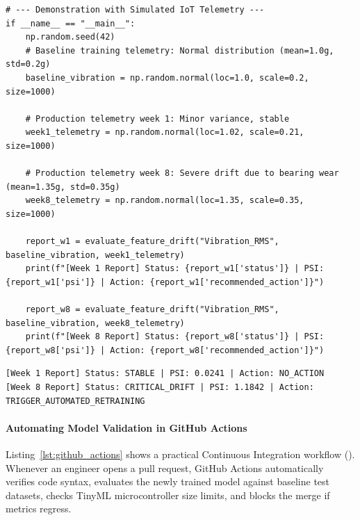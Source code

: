 \begin{lstlisting}[style=pythonstyle, caption={Production drift detection script with PSI and Kolmogorov-Smirnov test.}, label={lst:drift_detector}]
# --- Demonstration with Simulated IoT Telemetry ---
if __name__ == "__main__":
    np.random.seed(42)
    # Baseline training telemetry: Normal distribution (mean=1.0g, std=0.2g)
    baseline_vibration = np.random.normal(loc=1.0, scale=0.2, size=1000)

    # Production telemetry week 1: Minor variance, stable
    week1_telemetry = np.random.normal(loc=1.02, scale=0.21, size=1000)

    # Production telemetry week 8: Severe drift due to bearing wear (mean=1.35g, std=0.35g)
    week8_telemetry = np.random.normal(loc=1.35, scale=0.35, size=1000)

    report_w1 = evaluate_feature_drift("Vibration_RMS", baseline_vibration, week1_telemetry)
    print(f"[Week 1 Report] Status: {report_w1['status']} | PSI: {report_w1['psi']} | Action: {report_w1['recommended_action']}")

    report_w8 = evaluate_feature_drift("Vibration_RMS", baseline_vibration, week8_telemetry)
    print(f"[Week 8 Report] Status: {report_w8['status']} | PSI: {report_w8['psi']} | Action: {report_w8['recommended_action']}")
\end{lstlisting}

\begin{lstlisting}[style=outputstyle, caption={Console output of the automated drift detection engine.}]
[Week 1 Report] Status: STABLE | PSI: 0.0241 | Action: NO_ACTION
[Week 8 Report] Status: CRITICAL_DRIFT | PSI: 1.1842 | Action: TRIGGER_AUTOMATED_RETRAINING
\end{lstlisting}

\paragraph{Automating Model Validation in GitHub Actions}
Listing~\ref{lst:github_actions} shows a practical Continuous Integration workflow (). Whenever an engineer opens a pull request, GitHub Actions automatically verifies code syntax, evaluates the newly trained model against baseline test datasets, checks TinyML microcontroller size limits, and blocks the merge if metrics regress.

